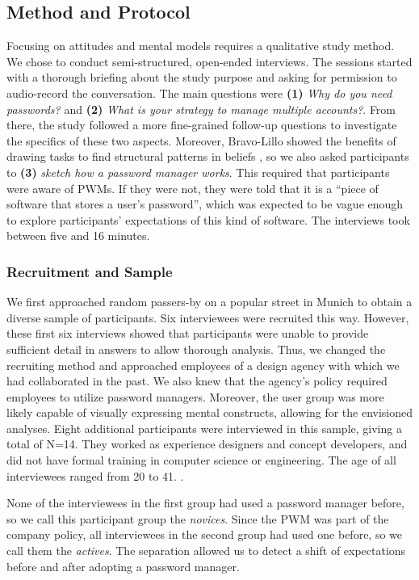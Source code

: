 \subsection{Method and Protocol}
Focusing on attitudes and mental models requires a qualitative study method. We chose to conduct semi-structured, open-ended interviews. The sessions started with a thorough briefing about the study purpose and asking for permission to audio-record the conversation. The main questions were \textbf{(1)} \textit{Why do you need passwords?} and \textbf{(2)} \textit{What is your strategy to manage multiple accounts?}. From there, the study followed a more fine-grained follow-up questions to investigate the specifics of these two aspects. Moreover, Bravo-Lillo \etal showed the benefits of drawing tasks to find structural patterns in beliefs \cite{BravoLillo2011WarningsMentalModel}, so we also asked participants to \textbf{(3)} \textit{sketch how a password manager works}. This required that participants were aware of \glspl{PWM}. If they were not, they were told that it is a ``piece of software that stores a user's password'', which was expected to be vague enough to explore participants' expectations of this kind of software. The interviews took between five and 16 minutes. 

\subsubsection{Recruitment and Sample}
We first approached random passers-by on a popular street in Munich to obtain a diverse sample of participants. Six interviewees were recruited this way. However, these first six interviews showed that participants were unable to provide sufficient detail in answers to allow thorough analysis. Thus, we changed the recruiting method and approached employees of a design agency with which we had collaborated in the past. We also knew that the agency's policy required employees to utilize password managers. Moreover, the user group was more likely capable of visually expressing mental constructs, allowing for the envisioned analyses. Eight additional participants were interviewed in this sample, giving a total of N=14. They worked as experience designers and concept developers, and did not have formal training in computer science or engineering. The age of all interviewees ranged from 20 to 41. . 

None of the interviewees in the first group had used a password manager before, so we call this participant group the \textit{novices}. Since the \gls{PWM} was part of the company policy, all interviewees in the second group had used one before, so we call them the \textit{actives}. The separation allowed us to detect a shift of expectations before and after adopting a password manager. 

